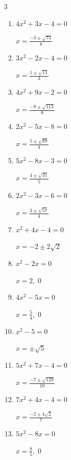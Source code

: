 \begin{multicols}{3}
\begin{enumerate}
  \item $4x^{2}+3x-4=0$

        $\displaystyle x=\frac{-3\pm \sqrt{73}}{8}$

  \item $3x^{2}-2x-4=0$

        $\displaystyle x=\frac{1\pm \sqrt{13}}{3}$

  \item $4x^{2}+9x-2=0$

        $\displaystyle x=\frac{-9\pm \sqrt{113}}{8}$

  \item $2x^{2}-5x-8=0$

        $\displaystyle x=\frac{5\pm \sqrt{89}}{4}$

  \item $5x^{2}-8x-3=0$

        $\displaystyle x=\frac{4\pm \sqrt{31}}{5}$

  \item $2x^{2}-3x-6=0$

        $\displaystyle x=\frac{3\pm \sqrt{57}}{4}$

  \item $x^{2}+4x-4=0$

        $\displaystyle x=-2\pm 2\sqrt{2}$

\columnbreak %

\resetques

  \item $x^{2}-2x=0$

        $\displaystyle x=2, \; 0$

  \item $4x^{2}-5x=0$

        $\displaystyle x=\frac{5}{4}, \; 0$

  \item $x^{2}-5=0$

        $\displaystyle x=\pm \sqrt{5}$

  \item $5x^{2}+7x-4=0$

        $\displaystyle x=\frac{-7\pm \sqrt{129}}{10}$

  \item $7x^{2}+4x-4=0$

        $\displaystyle x=\frac{-2\pm 4\sqrt{2}}{7}$

  \item $5x^{2}-8x=0$

        $\displaystyle x=\frac{8}{5}, \; 0$


\end{enumerate}
\end{multicols}
